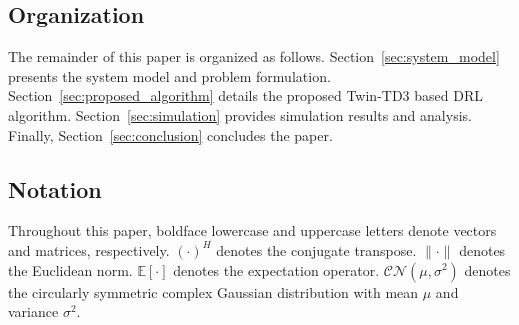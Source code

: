\subsection{Organization}

The remainder of this paper is organized as follows. Section~\ref{sec:system_model} presents the system model and problem formulation. Section~\ref{sec:proposed_algorithm} details the proposed Twin-TD3 based DRL algorithm. Section~\ref{sec:simulation} provides simulation results and analysis. Finally, Section~\ref{sec:conclusion} concludes the paper.

\subsection{Notation}

Throughout this paper, boldface lowercase and uppercase letters denote vectors and matrices, respectively. $(\cdot)^H$ denotes the conjugate transpose. $\|\cdot\|$ denotes the Euclidean norm. $\mathbb{E}[\cdot]$ denotes the expectation operator. $\mathcal{CN}(\mu, \sigma^2)$ denotes the circularly symmetric complex Gaussian distribution with mean $\mu$ and variance $\sigma^2$.
